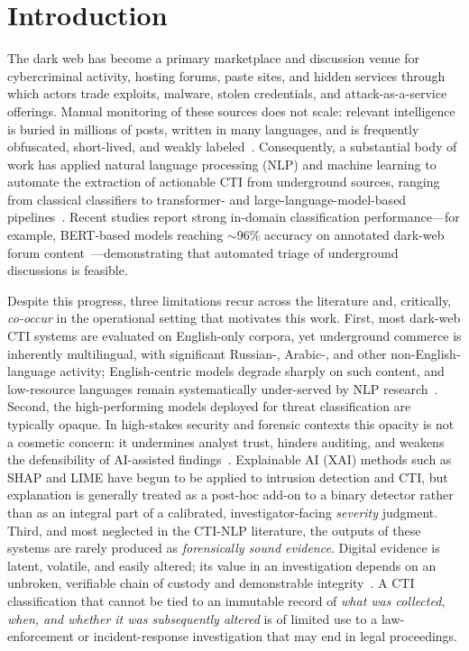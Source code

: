 \documentclass[11pt,a4paper]{article}
\begin{document}
\section{Introduction}\label{sec:intro}

The dark web has become a primary marketplace and discussion venue for cybercriminal
activity, hosting forums, paste sites, and hidden services through which actors trade
exploits, malware, stolen credentials, and attack-as-a-service offerings. Manual
monitoring of these sources does not scale: relevant intelligence is buried in millions
of posts, written in many languages, and is frequently obfuscated, short-lived, and
weakly labeled~\cite{schroer2025darkside,kadoguchi2019exploring}. Consequently, a
substantial body of work has applied natural language processing (NLP) and machine
learning to automate the extraction of actionable CTI from underground sources,
ranging from classical classifiers to transformer- and large-language-model-based
pipelines~\cite{sangher2023towards,sangher2024lstm,shah2025madcti,demarcos2026llm,pasupuleti2025threat}.
Recent studies report strong in-domain classification performance---for example,
BERT-based models reaching $\sim$96\% accuracy on annotated dark-web forum
content~\cite{sangher2023towards}---demonstrating that automated triage of underground
discussions is feasible.

Despite this progress, three limitations recur across the literature and, critically,
\emph{co-occur} in the operational setting that motivates this work. First, most
dark-web CTI systems are evaluated on English-only corpora, yet underground commerce is
inherently multilingual, with significant Russian-, Arabic-, and other non-English-language
activity; English-centric models degrade sharply on such content, and low-resource
languages remain systematically under-served by NLP
research~\cite{pakray2025nlp,alharbi2025bert,nazir2025multilingual}. Second, the
high-performing models deployed for threat classification are typically opaque. In
high-stakes security and forensic contexts this opacity is not a cosmetic concern: it
undermines analyst trust, hinders auditing, and weakens the defensibility of
AI-assisted findings~\cite{gaspar2024xai,hermosilla2025xai,sunkara2025xai}. Explainable
AI (XAI) methods such as SHAP and LIME have begun to be applied to intrusion detection
and CTI, but explanation is generally treated as a post-hoc add-on to a binary
detector rather than as an integral part of a calibrated, investigator-facing
\emph{severity} judgment. Third, and most neglected in the CTI-NLP literature, the
outputs of these systems are rarely produced as \emph{forensically sound evidence}.
Digital evidence is latent, volatile, and easily altered; its value in an investigation
depends on an unbroken, verifiable chain of custody and demonstrable
integrity~\cite{lone2019forensicchain,loffi2025management,patil2024potential}. A CTI
classification that cannot be tied to an immutable record of \emph{what was collected,
when, and whether it was subsequently altered} is of limited use to a law-enforcement
or incident-response investigation that may end in legal proceedings.
\end{document}

